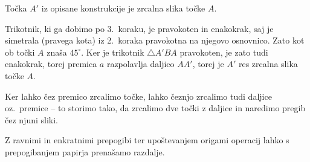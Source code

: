 \begin{trditev}
    Točka $A'$ iz opisane konstrukcije je zrcalna slika točke $A$.
\end{trditev}

\begin{dokaz}
    Trikotnik, ki ga dobimo po 3.\ koraku, je pravokoten in enakokrak, saj je simetrala (pravega kota) iz 2.\ koraka pravokotna na njegovo osnovnico. Zato kot ob točki $A$ znaša $45^{\circ}$. Ker je trikotnik $\triangle A'BA$ pravokoten, je zato tudi enakokrak, torej premica $a$ razpolavlja daljico $AA'$, torej je $A'$ res zrcalna slika točke $A$.
\end{dokaz}

Ker lahko čez premico zrcalimo točke, lahko čeznjo zrcalimo tudi daljice oz.\ premice -- to storimo tako, da zrcalimo dve točki z daljice in naredimo pregib čez njuni sliki.


\begin{trditev}
    \label{trd:prenasanje_razdalj}
    Z ravnimi in enkratnimi prepogibi ter upoštevanjem origami operacij lahko s prepogibanjem papirja prenašamo razdalje.
\end{trditev}

